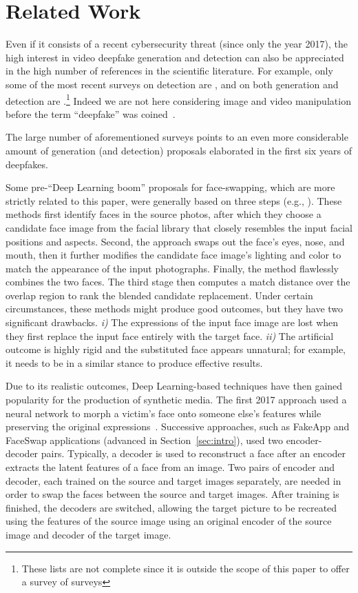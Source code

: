 \documentclass[preprint]{elsarticle}
\begin{document}
\section{Related Work}\label{sect:related}
Even if it consists of a recent cybersecurity threat (since only the year 2017), the high interest in video deepfake generation and detection can also be appreciated in the high number of references in the scientific literature. For example, only some of the most recent surveys on detection are \cite{surveydet,detection1,surveydet2}, and on both generation and detection are \cite{survey2,surveydgen1,survey3,survey4,survey1}.\footnote{These lists are not complete since it is outside the scope of this paper to offer a survey of surveys} Indeed we are not here considering image and video manipulation before the term ``deepfake'' was coined~\cite{farid,bookvideoprocessing}.

The large number of aforementioned surveys points to an even more considerable amount of generation (and detection) proposals elaborated in the first  six years of deepfakes.

Some  pre-``Deep Learning boom'' proposals for face-swapping, which are more strictly related to this paper, were generally based on three steps (e.g., \cite{beforeDL}). These methods first identify faces in the source photos, after which they choose a candidate face image from the facial library that closely resembles the input facial positions and aspects. Second, the approach swaps out the face's eyes, nose, and mouth, then it further modifies the candidate face image's lighting and color to match the appearance of the input photographs. Finally, the method flawlessly combines the two faces. The third stage then computes a match distance over the overlap region to rank the blended candidate replacement. Under certain circumstances, these methods might produce good outcomes, but they have two significant drawbacks. \emph{i)} The expressions of the input face image are lost when they first replace the input face entirely with the target face. \emph{ii)} The artificial outcome is highly rigid and the substituted face appears unnatural; for example, it needs to be in a similar stance to produce effective results.

Due to its realistic outcomes, Deep Learning-based techniques have then gained popularity for the production of synthetic media. The first 2017 approach used  a neural network to morph a victim’s face onto someone else’s features while preserving the original  expressions~\cite{survey2}. Successive approaches, such as FakeApp and FaceSwap applications (advanced in Section~\ref{sec:intro}),  used two encoder-decoder pairs. Typically, a decoder is used to reconstruct a face after an encoder extracts the latent features of a face from an image. Two pairs of encoder and decoder, each trained on the source and target images separately, are needed in order to swap the faces between the source and target images. After training is finished, the decoders are switched, allowing the target picture to be recreated using the features of the source image using an original encoder of the source image and decoder of the target image.
\end{document}
